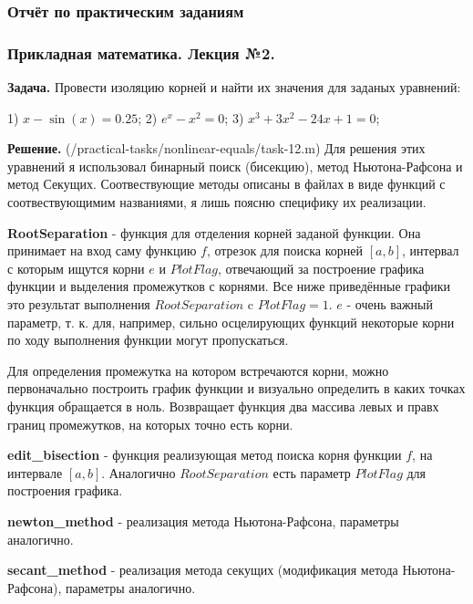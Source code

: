 \documentclass[a4paper, 12pt]{article}
\begin{document}
    \begin{center}
        \subsubsection*{Отчёт по практическим заданиям}
        \subsubsection*{Прикладная математика. Лекция №2.}
    \end{center}

    \quad \textbf{Задача.} Провести изоляцию корней и найти их значения для заданых уравнений:
    \begin{center}
        1) $x - \sin(x) = 0.25$;
        2) $e^x - x^2 = 0$;
        3) $x^3  + 3x^2 - 24x + 1 = 0$;
    \end{center}

    \quad \textbf{Решение.} (/practical-tasks/nonlinear-equals/task-12.m) Для решения этих уравнений я использовал бинарный поиск (бисекцию), метод Ньютона-Рафсона и метод Секущих. Соотвествующие методы описаны в файлах в виде функций с соотвествующимим названиями, я лишь поясню специфику их реализации.

    \quad \textbf{RootSeparation} - функция для отделения корней заданой функции. Она принимает на вход саму функцию $f$, отрезок для поиска корней $\left[ a, b\right]$, интервал с которым ищутся корни $e$ и $PlotFlag$, отвечающий за построение графика функции и выделения промежутков с корнями. Все ниже приведённые графики это результат выполнения $RootSeparation$ c $PlotFlag = 1$.
    $e$ - очень важный параметр, т. к. для, например, сильно осцелирующих функций некоторые корни по ходу выполнения функции могут пропускаться. 

    \quad Для определения промежутка на котором встречаются корни, можно первоначально построить график функции и визуально определить в каких точках функция обращается в ноль. Возвращает функция два массива левых и правх границ промежутков, на которых точно есть корни. 

    \quad \textbf{edit\_bisection} - функция реализующая метод поиска корня функции $f$, на интервале $\left[a, b\right]$. Аналогично $RootSeparation$ есть параметр $PlotFlag$ для построения графика.
    
    \quad \textbf{newton\_method} - реализация метода Ньютона-Рафсона, параметры аналогично.

    \quad \textbf{secant\_method} - реализация метода секущих (модификация метода Ньютона-Рафсона), параметры аналогично. 
\end{document}
